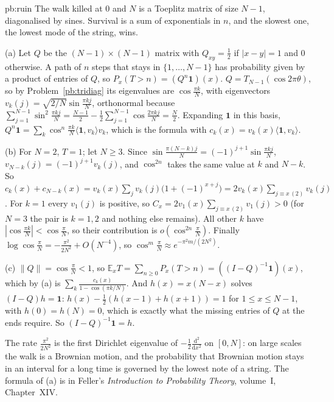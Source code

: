 \begin{solution}{pb:ruin}
\idea The walk killed at $0$ and $N$ is a Toeplitz matrix of size $N-1$, diagonalised by sines. Survival is a sum of exponentials in $n$, and the slowest one, the lowest mode of the string, wins.

\writeup (a) Let $Q$ be the $(N-1)\times(N-1)$ matrix with $Q_{xy}=\frac12$ if $|x-y|=1$ and $0$ otherwise. A path of $n$ steps that stays in $\{1,\dots,N-1\}$ has probability given by a product of
entries of $Q$, so $P_x(T>n)=(Q^n\mathbf 1)(x)$. $Q=T_{N-1}(\cos2\pi\theta)$, so by Problem~\ref{pb:tridiag} its eigenvalues are $\cos\frac{\pi k}N$, with eigenvectors
$v_k(j)=\sqrt{2/N}\sin\frac{\pi kj}N$, orthonormal because $\sum_{j=1}^{N-1}\sin^2\frac{\pi kj}N=\frac{N-1}2-\frac12\sum_{j=1}^{N-1}\cos\frac{2\pi kj}N=\frac N2$. Expanding $\mathbf 1$ in this basis,
$Q^n\mathbf 1=\sum_k\cos^n\frac{\pi k}N\langle\mathbf 1,v_k\rangle v_k$, which is the formula with $c_k(x)=v_k(x)\langle\mathbf 1,v_k\rangle$.

(b) For $N=2$, $T=1$; let $N\ge3$. Since $\sin\frac{\pi(N-k)j}N=(-1)^{j+1}\sin\frac{\pi kj}N$, $v_{N-k}(j)=(-1)^{j+1}v_k(j)$, and $\cos^{2n}$ takes the same value at $k$ and $N-k$. So
$c_k(x)+c_{N-k}(x)=v_k(x)\sum_jv_k(j)\bigl(1+(-1)^{x+j}\bigr)=2v_k(x)\sum_{j\equiv x\,(2)}v_k(j)$. For $k=1$ every $v_1(j)$ is positive, so $C_x=2v_1(x)\sum_{j\equiv x\,(2)}v_1(j)>0$ (for $N=3$ the pair is $k=1,2$ and nothing else remains). All other $k$ have $|\cos\frac{\pi k}N|<\cos\frac\pi N$, so their contribution is $o(\cos^{2n}\frac\pi N)$. Finally
$\log\cos\frac\pi N=-\frac{\pi^2}{2N^2}+O(N^{-4})$, so $\cos^m\frac\pi N\approx e^{-\pi^2m/(2N^2)}$.

(c) $\|Q\|=\cos\frac\pi N<1$, so $\mathbb E_xT=\sum_{n\ge0}P_x(T>n)=((I-Q)^{-1}\mathbf 1)(x)$, which by (a) is $\sum_k\frac{c_k(x)}{1-\cos(\pi k/N)}$. And $h(x)=x(N-x)$ solves $(I-Q)h=\mathbf 1$:
$h(x)-\frac12(h(x-1)+h(x+1))=1$ for $1\le x\le N-1$, with $h(0)=h(N)=0$, which is exactly what the missing entries of $Q$ at the ends require. So $(I-Q)^{-1}\mathbf 1=h$.

\leads The rate $\frac{\pi^2}{2N^2}$ is the first Dirichlet eigenvalue of $-\frac12\frac{\mathrm d^2}{\mathrm dx^2}$ on $[0,N]$: on large scales the walk is a Brownian motion, and the probability that
Brownian motion stays in an interval for a long time is governed by the lowest note of a string. The formula of (a) is in Feller's \emph{Introduction to Probability Theory}, volume~I, Chapter~XIV.
\end{solution}

